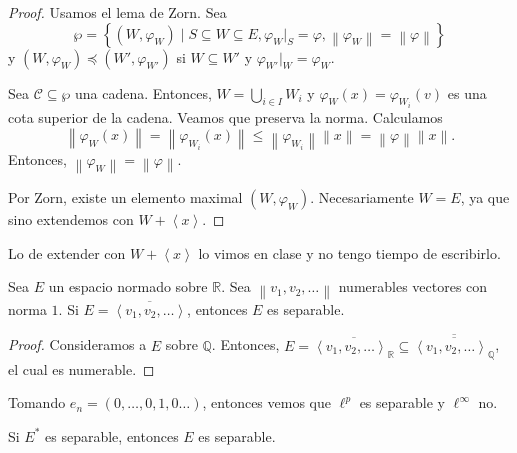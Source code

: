 \begin{proof}
	Usamos el lema de Zorn. Sea
	$$\wp = \left\{ (W, \varphi_W)  \mid S \subseteq W \subseteq E, \varphi_W|_S = \varphi, \left\lVert \varphi_W \right\rVert = \left\lVert \varphi \right\rVert \right\}$$
	y $(W, \varphi_W) \preceq (W', \varphi_{W'})$ si $W \subseteq W'$ y $\varphi_{W'}|_{W} = \varphi_{W}$.

	Sea $\mathcal{C} \subseteq \wp$ una cadena. Entonces, $W = \bigcup_{i \in I} W_i$ y $\varphi_W (x) = \varphi_{W_i}(v)$ es una cota superior de la cadena. Veamos que preserva la norma. Calculamos
	\begin{equation*}
		\left\lVert \varphi_{W}(x) \right\rVert = \left\lVert \varphi_{W_i}(x) \right\rVert \leq \left\lVert \varphi_{W_i} \right\rVert \left\lVert x \right\rVert = \left\lVert \varphi \right\rVert \left\lVert x \right\rVert.
	\end{equation*}
	Entonces, $\left\lVert \varphi_{W} \right\rVert = \left\lVert \varphi \right\rVert$.

	Por Zorn, existe un elemento maximal $(W, \varphi_{W})$. Necesariamente $W = E$, ya que sino extendemos con $W + \left\langle x \right\rangle$.
\end{proof}

Lo de extender con $W + \left\langle x \right\rangle$ lo vimos en clase y no tengo tiempo de escribirlo.

\begin{proposition}
	Sea $E$ un espacio normado sobre $\mathbb{R}$. Sea $\left\lVert v_1, v_2, \ldots \right\rVert$ numerables vectores con norma $1$. Si $E = \overline{\left\langle v_1, v_2, \ldots \right\rangle}$, entonces $E$ es separable.
\end{proposition}

\begin{proof}
	Consideramos a $E$ sobre $\mathbb{Q}$. Entonces, $E = \overline{\left\langle v_1, v_2, \ldots \right\rangle_{\mathbb{R}}} \subseteq \overline{\overline{\left\langle v_1, v_2, \ldots \right\rangle_{\mathbb{Q}}}}$, el cual es numerable.
\end{proof}

\begin{remark}
	Tomando $e_n = (0, \ldots, 0, 1, 0 \ldots)$, entonces vemos que $\ell^p$ es separable y $\ell^{\infty}$ no.
\end{remark}

\begin{theorem}
	Si $E^*$ es separable, entonces $E$ es separable.
\end{theorem}

